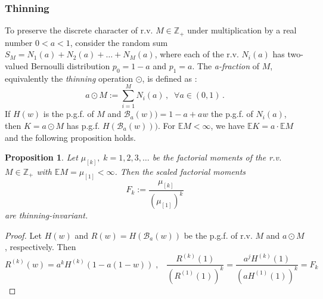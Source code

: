 \documentclass[a4paper,12pt]{amsart}
\newcommand{\E}{\mathbb{E}}
\newcommand{\Z}{\mathbb{Z}_{+}}
\newtheorem{Proposition}{Proposition}[section]
\theoremstyle{definition}
\theoremstyle{remark}
\begin{document}
\subsubsection{Thinning}
To preserve the discrete character of r.v. $M\in \Z$ under multiplication by a real number $0<a<1$, consider the random sum $S_M=N_1(a)\!+\!N_2(a)\!+\! \ldots\! +\!N_M(a)$, where each of the r.v. $N_i(a)$ has two-valued Bernoulli distribution $p_0=1-a$ and $p_1=a$.  The {\it a-fraction}  of $M$, equivalently the   {\it thinning} operation $\odot$, is defined as \cite{StvH79}: 
\vspace*{-.1cm}
\begin{equation}
a \odot M:=   \sum_{i=1}^M N_i(a)\,,\;\;\forall a \in (0,1)\,.
    \label{thin}
\end{equation}
If $H(w)$ is the p.g.f. of  $M$ and $\mathcal{B}_{a}(w))=1-a + aw$ the p.g.f. of $N_i(a)$, then $K=a\odot M$ has p.g.f. $H(\mathcal{B}_{a}(w)))$.  For $\E M < \infty$, we have $\E K = a \cdot \E M$ and the following proposition holds.

\begin{Proposition}\label{prop:scal}
Let $\mu_{[k]},\;k=1,2,3,\ldots $ be the factorial moments of the r.v. $M \in \mathbb{Z}_+$ with  $\E M=\mu_{[1]}< \infty$. Then the {\it scaled factorial moments}   
\begin{equation}
\label{eq: Fj}
F_k := \frac{\mu_{[k]}}{(\mu_{[1]})^k} 
\end{equation}
are thinning-invariant. 
\end{Proposition}
\begin{proof}
Let  $H(w)$ and $R(w)=H(\mathcal{B}_{a}(w))$ be the p.g.f. of r.v. $M$ and $a\odot M$, respectively.  Then
\[ R^{(k)}(w)=a^k H^{(k)}(1\!-\!a(1\!-\! w))\;,\;\;\;
\frac{R^{(k)}(1)}{(R^{(1)}(1))^k}\!=\!\frac{a^jH^{(k)}(1)}{(a H^{(1)}(1))^k}\!=\! F_k \]   
\end{proof}
\end{document}
